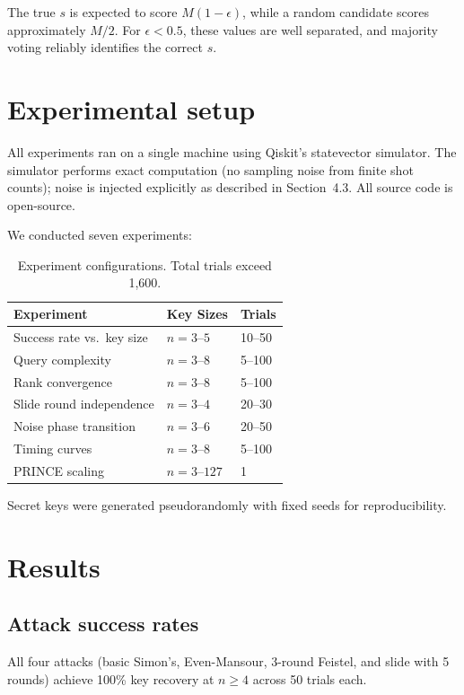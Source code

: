 \documentclass[11pt]{article}
\begin{document}
The true $s$ is expected to score $M(1 - \epsilon)$, while a random candidate scores approximately $M/2$. For $\epsilon < 0.5$, these values are well separated, and majority voting reliably identifies the correct $s$.

\section{Experimental setup}

All experiments ran on a single machine using Qiskit's statevector simulator. The simulator performs exact computation (no sampling noise from finite shot counts); noise is injected explicitly as described in Section~4.3. All source code is open-source.

We conducted seven experiments:

\begin{table}[h]
\centering
\small
\begin{tabular}{@{}lll@{}}
\toprule
Experiment & Key Sizes & Trials \\
\midrule
Success rate vs.\ key size & $n = 3$--$5$ & 10--50 \\
Query complexity & $n = 3$--$8$ & 5--100 \\
Rank convergence & $n = 3$--$8$ & 5--100 \\
Slide round independence & $n = 3$--$4$ & 20--30 \\
Noise phase transition & $n = 3$--$6$ & 20--50 \\
Timing curves & $n = 3$--$8$ & 5--100 \\
PRINCE scaling & $n = 3$--$127$ & 1 \\
\bottomrule
\end{tabular}
\caption{Experiment configurations. Total trials exceed 1,600.}
\end{table}

Secret keys were generated pseudorandomly with fixed seeds for reproducibility.

\section{Results}

\subsection{Attack success rates}

All four attacks (basic Simon's, Even-Mansour, 3-round Feistel, and slide with 5 rounds) achieve 100\% key recovery at $n \geq 4$ across 50 trials each.
\end{document}
